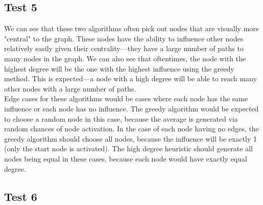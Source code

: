 \documentclass{article}
\begin{document}
\subsection{Test 5}
    \begin{center}
    \end{center}

We can see that these two algorithms often pick out nodes that are visually more "central" to the graph.  These nodes have the ability to influence other nodes relatively easily given their centrality---they have a large number of paths to many nodes in the graph.  We can also see that oftentimes, the node with the highest degree will be the one with the highest influence using the greedy method.  This is expected---a node with a high degree will be able to reach many other nodes with a large number of paths. \\ 

Edge cases for these algorithms would be cases where each node has the same influence or each node has no influence.  The greedy algorithm would be expected to choose a random node in this case, because the average is generated via random chances of node activation.  In the case of each node having no edges, the greedy algorithm should choose all nodes, because the influence will be exactly 1 (only the start node is activated).  The high degree heuristic should generate all nodes being equal in these cases, because each node would have exactly equal degree. \\

\subsection{Test 6}
    \begin{center}
    \end{center}
\end{document}
